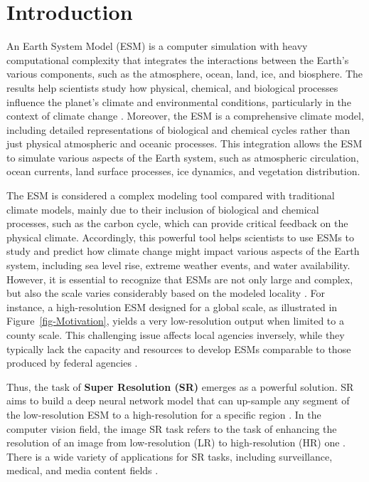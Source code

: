 \documentclass[pdflatex,sn-mathphys-num]{sn-jnl}%
\begin{document}
\section{Introduction}\label{sec1}

An Earth System Model (ESM) is a computer simulation with heavy computational complexity that integrates the interactions between the Earth's various components, such as the atmosphere, ocean, land, ice, and biosphere. The results help scientists study how physical, chemical, and biological processes influence the planet's climate and environmental conditions, particularly in the context of climate change \cite{climate2013ems}. Moreover, the ESM is a comprehensive climate model, including detailed representations of biological and chemical cycles rather than just physical atmospheric and oceanic processes. This integration allows the ESM to simulate various aspects of the Earth system, such as atmospheric circulation, ocean currents, land surface processes, ice dynamics, and vegetation distribution.

The ESM is considered a complex modeling tool compared with traditional climate models, mainly due to their inclusion of biological and chemical processes, such as the carbon cycle, which can provide critical feedback on the physical climate. Accordingly, this powerful tool helps scientists to use ESMs to study and predict how climate change might impact various aspects of the Earth system, including sea level rise, extreme weather events, and water availability\cite{heinze2019}. However, it is essential to recognize that ESMs are not only large and complex, but also the scale varies considerably based on the modeled locality \cite{eyring2016}. For instance, a high-resolution ESM designed for a global scale, as illustrated in Figure~\ref{fig-Motivation}, yields a very low-resolution output when limited to a county scale. This challenging issue affects local agencies inversely, while they typically lack the capacity and resources to develop ESMs comparable to those produced by federal agencies \cite{vandal2017}.

Thus, the task of \textbf{Super Resolution (SR)} emerges as a powerful solution. SR aims to build a deep neural network model that can up-sample any segment of the low-resolution ESM to a high-resolution for a specific region \cite{rahaman2019}.
In the computer vision field, the image SR task refers to the task of enhancing the resolution of an image from low-resolution (LR) to high-resolution (HR) one \cite{yang2019}. There is a wide variety of applications for SR tasks, including surveillance, medical, and media content fields \cite{Dong2016}. 
\end{document}

